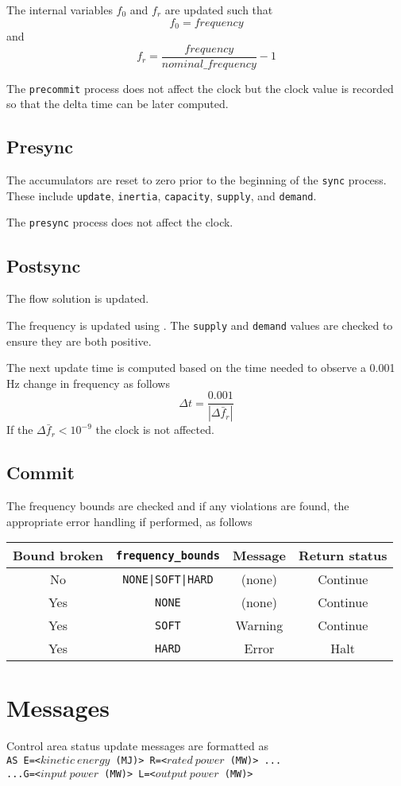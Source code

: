 The internal variables $f_0$ and $f_r$ are updated such that
\begin{equation}
	f_0 = frequency
\end{equation}
and
\begin{equation}
	f_r = \frac{frequency}{nominal\_frequency} - 1
\end{equation}

The \texttt{precommit} process does not affect the clock but the clock value is recorded so that the delta time can be later computed.

\subsection{Presync}

The accumulators are reset to zero prior to the beginning of the \texttt{sync} process.  These include \texttt{update}, \texttt{inertia}, \texttt{capacity}, \texttt{supply}, and \texttt{demand}.

The \texttt{presync} process does not affect the clock.

\subsection{Postsync}

The flow solution is updated. 

The frequency is updated using . The \texttt{supply} and \texttt{demand} values are checked to ensure they are both positive.

The next update time is computed based on the time needed to observe a 0.001 Hz change in frequency as follows
\begin{equation}
	\Delta t = \frac{0.001}{|\Delta \bar f_r|}
\end{equation}
If the $\Delta \bar f_r<10^{-9}$ the clock is not affected.


\subsection{Commit}

The frequency bounds are checked and if any violations are found, the appropriate error handling if performed, as follows

\begin{center} \begin{tabular}{cccc}
Bound broken & \texttt{frequency\_bounds} & Message & Return status \\
\hline
No	& \texttt{NONE|SOFT|HARD} & (none) & Continue \\
Yes & \texttt{NONE} & (none) & Continue \\
Yes & \texttt{SOFT} & Warning & Continue \\
Yes & \texttt{HARD} & Error & Halt
\end{tabular} \end{center}

\section{Messages}

Control area status update messages are formatted as \\
\texttt{AS E=<$kinetic\ energy$ (MJ)> R=<$rated\ power$ (MW)> ...} \\
\texttt{...G=<$input\ power$ (MW)> L=<$output\ power$ (MW)>} 